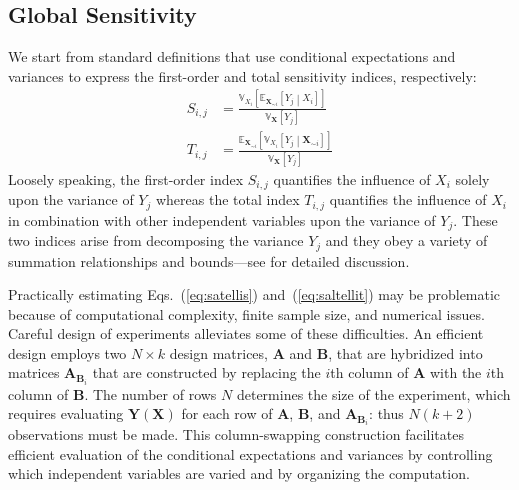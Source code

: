 \documentclass[12pt]{article}
\begin{document}
\subsection{Global Sensitivity}
\label{sec:glob}

We start from standard definitions \citep{saltelli_variance_2010} that use conditional expectations and variances to express the first-order and total sensitivity indices, respectively:
\begin{align}
    S_{i,j} & = \frac{\mathbb{V}_{X_i} \left[ \mathbb{E}_{\mathbf{X}_{\sim i}} \left[ Y_j \middle| X_i \right] \right]}{\mathbb{V}_\mathbf{X} \left[ Y_j \right]} \label{eq:satellis}
    \\
    T_{i,j} & = \frac{\mathbb{E}_{\mathbf{X}_{\sim i}} \left[ \mathbb{V}_{X_i} \left[ Y_j \middle| \mathbf{X}_{\sim i} \right] \right]}{\mathbb{V}_\mathbf{X} \left[ Y_j \right]} \label{eq:saltellit}
\end{align}
Loosely speaking, the first-order index $S_{i,j}$ quantifies the influence of $X_i$ solely upon the variance of $Y_j$ whereas the total index $T_{i,j}$ quantifies the influence of $X_i$ in combination with other independent variables upon the variance of $Y_j$. These two indices arise from decomposing the variance $Y_j$ and they obey a variety of summation relationships and bounds---see \citet{saltelli_sensitivity_2004} for detailed discussion.

Practically estimating Eqs.~(\ref{eq:satellis}) and~(\ref{eq:saltellit}) may be problematic because of computational complexity, finite sample size, and numerical issues. Careful design of experiments alleviates some of these difficulties. An efficient design employs two $N \times k$ design matrices, $\mathbf{A}$ and $\mathbf{B}$, that are hybridized into matrices $\mathbf{A}_{\mathbf{B}_i}$ that are constructed by replacing the $i$th column of $\mathbf{A}$ with the $i$th column of $\mathbf{B}$. The number of rows $N$ determines the size of the experiment, which requires evaluating $\mathbf{Y}\left(\mathbf{X}\right)$ for each row of $\mathbf{A}$, $\mathbf{B}$, and $\mathbf{A}_{\mathbf{B}_i}$: thus $N (k + 2)$ observations must be made. This column-swapping construction facilitates efficient evaluation of the conditional expectations and variances by controlling which independent variables are varied and by organizing the computation.
\end{document}
